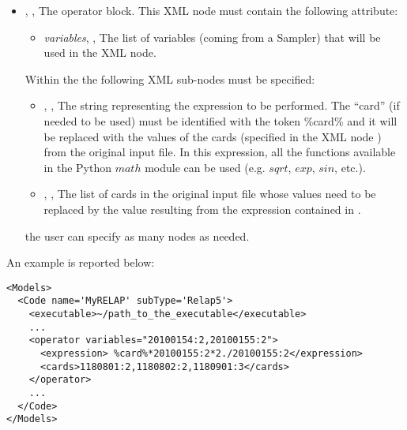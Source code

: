 \begin{itemize}
   \item {}, , The operator block.
    This XML node must contain the following attribute:
     \begin{itemize}
      \item \textit{variables}, , The list of variables
       (coming from a Sampler) that will be used in the   XML node.
      \end{itemize}
     Within the   the following XML sub-nodes must be specified:
     \begin{itemize}
        \item {}, , The string representing the expression to be
        performed. The ``card'' (if needed to be used) must be identified with the token \%card\% and it
         will be replaced with the values of the cards
        (specified in the XML node  ) from the original input file. In this expression, all the functions available in
        the Python $math$ module can be used (e.g. $sqrt$, $exp$, $sin$, etc.).
         \item {}, ,
          The list of cards in the original input file whose values need to be replaced by the value resulting from the expression
          contained in .
     \end{itemize}
    \nb the user can specify as many  nodes as needed.
\end{itemize}
An example is reported below:
\begin{lstlisting}[style=XML]
<Models>
  <Code name='MyRELAP' subType='Relap5'>
    <executable>~/path_to_the_executable</executable>
    ...
    <operator variables="20100154:2,20100155:2">
      <expression> %card%*20100155:2*2./20100155:2</expression>
      <cards>1180801:2,1180802:2,1180901:3</cards>
    </operator>
    ...
  </Code>
</Models>
\end{lstlisting}


